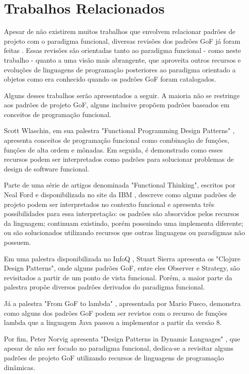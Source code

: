 \chapter{Trabalhos Relacionados}

Apesar de não existirem muitos trabalhos que envolvem
relacionar padrões de projeto com o paradigma funcional, 
diversas revisões dos padrões GoF já foram feitas 
\cite{nealford,peternorvig,scottwlaschin,stuartsierra,mariofusco}.
Essas revisões são orientadas tanto ao paradigma 
funcional - como neste trabalho - quanto a  
uma visão mais abrangente, que aproveita 
outros recursos e evoluções de linguagens de 
programação posteriores ao paradigma orientado a 
objetos como era 
conhecido quando os padrões GoF foram catalogados.

Alguns desses trabalhos serão apresentados a seguir.
A maioria não se restringe aos padrões de 
projeto GoF, alguns inclusive propõem padrões baseados 
em conceitos de programação funcional.

Scott Wlaschin, em sua palestra "Functional Programming 
Design Patterns" \cite{scottwlaschin}, apresenta conceitos de programação 
funcional como combinação de funções, funções de alta 
ordem e mônadas. Em seguida, é demonstrado como esses 
recursos podem ser 
interpretados como padrões para solucionar problemas 
de design de software funcional.

Parte de uma série de artigos denominada "Functional 
Thinking", escritos por Neal Ford e disponibilizada 
no site da IBM \cite{nealford}, descreve como alguns padrões de projeto 
podem ser interpretados no contexto funcional e 
apresenta três possibilidades para essa interpretação: 
os padrões são absorvidos pelos recursos da 
linguagem; continuam existindo, porém possuindo 
uma implementa diferente; ou são solucionados 
utilizando recursos que outras linguagens ou 
paradigmas não possuem.

Em uma palestra disponibilizada no InfoQ \cite{stuartsierra}, Stuart Sierra 
apresenta os "Clojure Design Patterns", onde alguns 
padrões GoF, entre eles Observer e Strategy, são 
revisitados a partir de um ponto de vista funcional. 
Porém, a maior parte da palestra propõe 
diversos padrões derivados do paradigma funcional.

Já a palestra "From GoF to lambda" \cite{mariofusco}, apresentada por 
Mario Fusco, demonstra como alguns dos padrões GoF 
podem ser revistos com o recurso de funções lambda 
que a linguagem Java passou a implementar a partir 
da versão 8.

Por fim, Peter Norvig apresenta "Design Patterns in 
Dynamic Languages" \cite{peternorvig}, que apesar de não ser focado 
no paradigma funcional, dedica-se a revisitar alguns 
padrões de projeto GoF utilizando recursos de linguagens 
de programação dinâmicas. 
